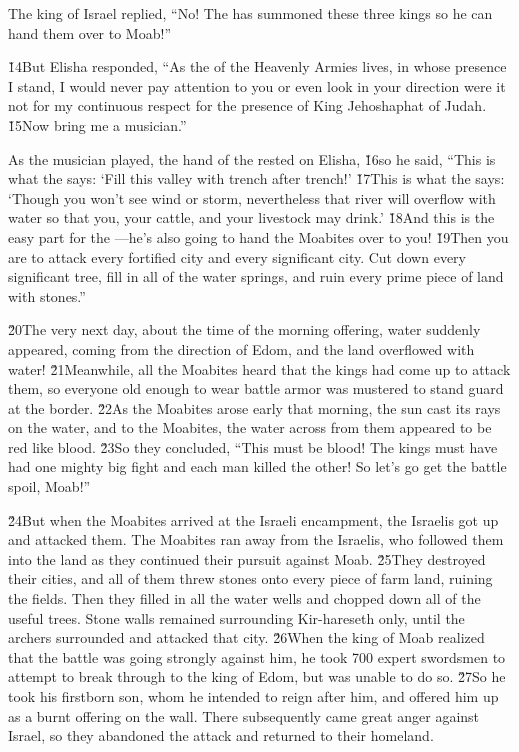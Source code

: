 The king of Israel replied, ``No! The  has summoned these three kings so he can hand them over to Moab!''

\v{14}But Elisha responded, ``As the  of the Heavenly Armies lives, in whose presence I stand, I would never pay attention to you or even look in your direction were it not for my continuous respect for the presence of King Jehoshaphat of Judah. \v{15}Now bring me a musician.''

As the musician played, the hand of the  rested on Elisha, \v{16}so he said, ``This is what the  says: `Fill this valley with trench after trench!' \v{17}This is what the  says: `Though you won't see wind or storm, nevertheless that river will overflow with water so that you, your cattle, and your livestock may drink.' \v{18}And this is the easy part for the ---he's also going to hand the Moabites over to you! \v{19}Then you are to attack every fortified city and every significant city. Cut down every significant tree, fill in all of the water springs, and ruin every prime piece of land with stones.''

\v{20}The very next day, about the time of the morning offering, water suddenly appeared, coming from the direction of Edom, and the land overflowed with water! \v{21}Meanwhile, all the Moabites heard that the kings had come up to attack them, so everyone old enough to wear battle armor was mustered to stand guard at the border. \v{22}As the Moabites arose early that morning, the sun cast its rays on the water, and to the Moabites, the water across from them appeared to be red like blood. \v{23}So they concluded, ``This must be blood! The kings must have had one mighty big fight and each man killed the other! So let's go get the battle spoil, Moab!''

\v{24}But when the Moabites arrived at the Israeli encampment, the Israelis got up and attacked them. The Moabites ran away from the Israelis, who followed them into the land as they continued their pursuit against Moab. \v{25}They destroyed their cities, and all of them threw stones onto every piece of farm land, ruining the fields. Then they filled in all the water wells and chopped down all of the useful trees. Stone walls remained surrounding Kir-hareseth only, until the archers surrounded and attacked that city. \v{26}When the king of Moab realized that the battle was going strongly against him, he took 700 expert swordsmen to attempt to break through to the king of Edom, but was unable to do so. \v{27}So he took his firstborn son, whom he intended to reign after him, and offered him up as a burnt offering on the wall. There subsequently came great anger against Israel, so they abandoned the attack and returned to their homeland.

